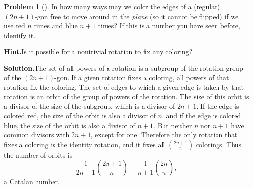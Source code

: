 \documentclass[10pt,]{book}
\theoremstyle{plain}
\theoremstyle{definition}
\newtheorem{activity}[project]{Problem}
\theoremstyle{definition}
\numberwithin{equation}{chapter}
\begin{document}
\begin{activity}[]\label{Catalancircle}
In how many ways may we color the edges of a (regular) \((2n+1)\)-gon free to move around in the \emph{plane} (so it cannot be flipped) if we use red \(n\) times and blue \(n+1\) times? If this is a number you have seen before, identify it. %
\par\medskip\noindent%
\textbf{Hint.}\quad Is it possible for a nontrivial rotation to fix any coloring?%
\par\medskip\noindent%
\textbf{Solution.}\quad The set of all powers of a rotation is a subgroup of the rotation group of the \((2n+1)\)-gon. If a given rotation fixes a coloring, all powers of that rotation fix the coloring. The set of edges to which a given edge is taken by that rotation is an orbit of the group of powers of the rotation. The size of this orbit is a divisor of the size of the subgroup, which is a divisor of \(2n+1\). If the edge is colored red, the size of the orbit is also a divisor of \(n\), and if the edge is colored blue, the size of the orbit is also a divisor of \(n+1\). But neither \(n\) nor \(n+1\) have common divisors with \(2n+1\), except for one. Therefore the only rotation that fixes a coloring is the identity rotation, and it fixes all \(\binom{2n+1}{n}\) colorings. Thus the number of orbits is%
\begin{equation*}
\frac{1}{2n+1}\binom{2n+1}{n} = \frac{1}{n+1}\binom{2n}{n},
\end{equation*}
a Catalan number.%
\end{activity}
\end{document}
